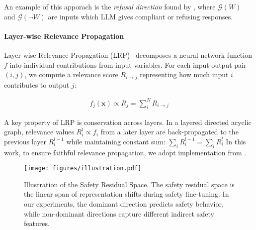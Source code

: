 An example of this apporach is the \emph{refusal direction} found by \citet{arditi2024refusal}, where $\mathcal{G}(W)$ and $\mathcal{G}(\neg W)$ are inputs which LLM gives compliant or refusing responses.

\paragraph{Layer-wise Relevance Propagation} 
Layer-wise Relevance Propagation (LRP)~\cite{bach2015pixel} decomposes a neural network function $f$ into individual contributions from input variables. For each input-output pair $(i,j)$, we compute a relevance score $R_{i \rightarrow j}$ representing how much input $i$ contributes to output $j$:

\begin{align*}
    f_j(\mathbf{x}) \propto R_j = \sum_{i}^N R_{i \rightarrow j}
\end{align*}

A key property of LRP is conservation across layers. In a layered directed acyclic graph, relevance values $R_i^l \propto f_i$ from a later layer are back-propagated to the previous layer $R_i^{l-1}$ while maintaining constant sum: $\sum_i R_i^{l-1} = \sum_i R_i^l$ In this work, to ensure faithful relevance propagation, we adopt implementation from \citet{achtibat2024attnlrp}.


\begin{figure}
    \vskip 0.2in
    \begin{center}
    \centerline{\texttt{[image: figures/illustration.pdf]}}
    \caption{Illustration of the Safety Residual Space. The safety residual space is the linear span of representation shifts during safety fine-tuning. In our experiments, the dominant direction predicts safety behavior, while non-dominant directions capture different indirect safety features.}
    \label{fig:illustration}
    \end{center}
    \vskip -0.2in
\end{figure}